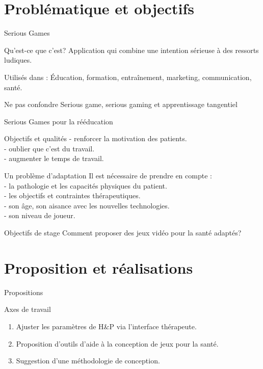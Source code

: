 \documentclass{beamer}
\begin{document}
	\section{Problématique et objectifs}
		\begin{frame}{Serious Games}
			\begin{block}{Qu'est-ce que c'est?}
				Application qui combine une intention sérieuse à des ressorts ludiques.
			\end{block}\pause
			\begin{exampleblock}{Utilisés dans :}
				Éducation, formation, entraînement, marketing, communication, santé.
			\end{exampleblock}	\pause
			\begin{alertblock}{Ne pas confondre}
				Serious game, serious gaming et apprentissage tangentiel
			\end{alertblock}
		\end{frame}
	
		\begin{frame}{Serious Games pour la rééducation}
			\begin{exampleblock}{Objectifs et qualités}
				- renforcer la motivation des patients.\\
				- oublier que c'est du travail. \\
				- augmenter le temps de travail.
			\end{exampleblock}\pause
			\begin{alertblock}{Un problème d'adaptation}
			Il est nécessaire de prendre en compte :\\
					- la pathologie et les capacités physiques du patient.\\
					- les objectifs et contraintes thérapeutiques.\\
					- son âge, son aisance avec les nouvelles technologies.\\
					- son niveau de joueur.
			\end{alertblock}
		\end{frame}
	
		\begin{frame}{Objectifs de stage}		
			\large{Comment proposer des jeux vidéo pour la santé adaptés?}
		\end{frame}
		
	\section{Proposition et réalisations}	
		\begin{frame}{Propositions}
			\begin{block}{Axes de travail}			
				\begin{enumerate}
					\item Ajuster les paramètres de H\&P via l'interface thérapeute.
					\item Proposition d'outils d'aide à la conception de jeux pour la santé.
					\item Suggestion d'une méthodologie de conception.
				\end{enumerate}
			\end{block}
		\end{frame}		
			
\end{document}

